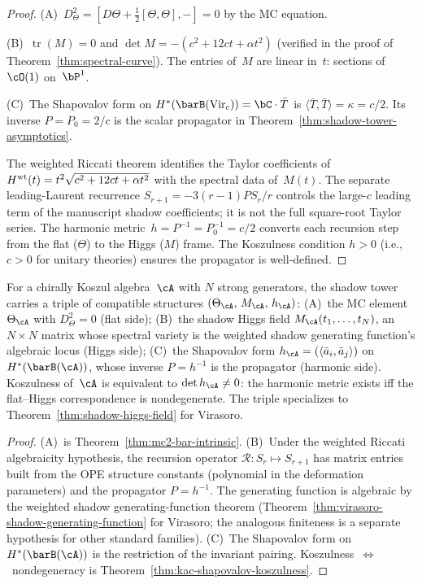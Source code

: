 \begin{proof}
(A)~$D_\Theta^2 = [D\Theta + \tfrac12[\Theta,\Theta], -] = 0$
by the MC equation.

(B)~$\operatorname{tr}(M) = 0$ and
$\det M = -(c^2{+}12ct{+}\alpha t^2)$ (verified in the proof of
Theorem~\ref{thm:spectral-curve}). The entries of~$M$ are
linear in~$t$: sections of $\cO(1)$ on~$\bP^1$.

(C)~The Shapovalov form on
$H^*(\barB(\mathrm{Vir}_c)) = \bC\cdot\bar{T}$ is
$\langle\bar{T},\bar{T}\rangle = \kappa = c/2$. Its inverse
$P=P_0 = 2/c$ is the scalar propagator in
Theorem~\ref{thm:shadow-tower-asymptotics}.

The weighted Riccati theorem identifies the Taylor coefficients of
$H^{\rm wt}(t)=t^2\sqrt{c^2+12ct+\alpha t^2}$ with the spectral data
of~$M(t)$. The separate leading-Laurent recurrence
$S_{r+1}=-3(r{-}1)PS_r/r$ controls the large-$c$ leading term of the
manuscript shadow coefficients; it is not the full square-root Taylor
series. The harmonic metric~$h = P^{-1} = P_0^{-1} = c/2$ converts each
recursion step from the flat ($\Theta$) to the Higgs ($M$) frame. The Koszulness condition
$h > 0$ (i.e., $c > 0$ for unitary theories) ensures the
propagator is well-defined.
\end{proof}

\begin{theorem}
\label{thm:general-nahc}
\ClaimStatusConditional
{}
For a chirally Koszul algebra~$\cA$ with $N$ strong
generators, the shadow tower carries a triple of compatible
structures $(\Theta_\cA,\, M_\cA,\, h_\cA)$:
\textup{(A)}~the MC element $\Theta_\cA$ with
$D_\Theta^2 = 0$ \textup{(}flat side\textup{)};
\textup{(B)}~the shadow Higgs field
$M_\cA(t_1,\dotsc,t_N)$, an $N \times N$ matrix whose spectral
variety is the weighted shadow generating function's algebraic locus
\textup{(}Higgs side\textup{)};
\textup{(C)}~the Shapovalov form
$h_\cA = (\langle\bar{a}_i,\bar{a}_j\rangle)$ on
$H^*(\barB(\cA))$, whose inverse $P = h^{-1}$ is the
propagator \textup{(}harmonic side\textup{)}.
Koszulness of~$\cA$ is equivalent to
$\det h_\cA \neq 0$: the harmonic metric exists iff the
flat--Higgs correspondence is nondegenerate.
The triple specializes to Theorem~\textup{\ref{thm:shadow-higgs-field}}
for Virasoro.
\end{theorem}

\begin{proof}
(A)~is Theorem~\ref{thm:mc2-bar-intrinsic}.
(B)~Under the weighted Riccati algebraicity hypothesis, the recursion operator
$\mathcal{R}\colon S_r \mapsto S_{r+1}$ has matrix entries built from the
OPE structure constants (polynomial in the deformation parameters)
and the propagator $P = h^{-1}$. The generating function is
algebraic by the weighted shadow generating-function theorem
(Theorem~\ref{thm:virasoro-shadow-generating-function} for
Virasoro; the analogous finiteness is a separate hypothesis for other
standard families).
(C)~The Shapovalov form on $H^*(\barB(\cA))$ is the restriction of
the invariant pairing. Koszulness~$\Leftrightarrow$~nondegeneracy
is Theorem~\ref{thm:kac-shapovalov-koszulness}.
\end{proof}

